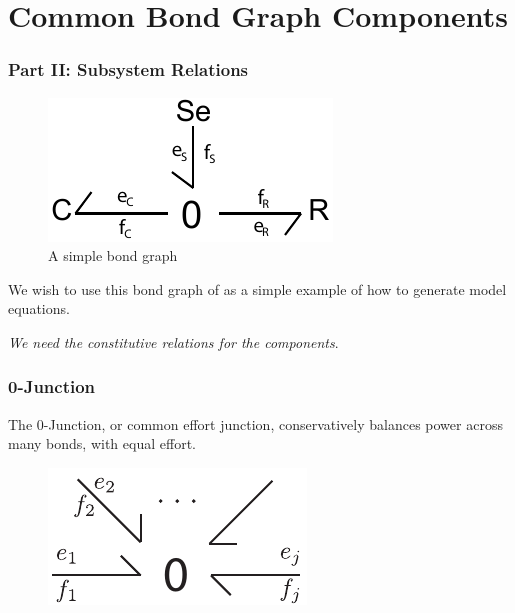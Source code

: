 \documentclass[11pt,reqno]{beamer}
\begin{document}
\section{Common Bond Graph Components}
\begin{frame}
\frametitle{Part II: Subsystem Relations}
\begin{figure}
\includegraphics{RC_bondgraph.pdf}
\caption{A simple bond graph}
\end{figure}
We wish to use this bond graph of as a simple example of how to generate model equations.
\vspace{10pt}

\begin{center}
\emph{We need the constitutive relations for the components}.
\end{center}

\begin{figure}
\end{figure}
\end{frame}
\begin{frame}
\frametitle{0-Junction}
The 0-Junction, or common effort junction, conservatively balances power across many bonds, with equal effort.
\begin{figure}
\includegraphics{nport-0.pdf}
\end{figure}
\end{frame}
\end{document}
